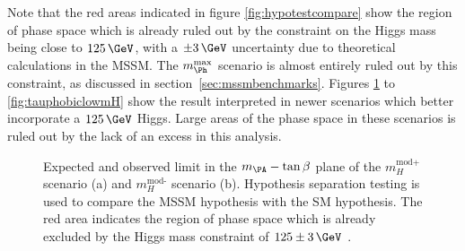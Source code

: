 Note that the red areas indicated in figure \ref{fig:hypotestcompare} show the
region of phase space which is already ruled out by the constraint on the Higgs
mass being close to $125\,\GeV$, with a $\pm 3\,\GeV$ uncertainty due to
theoretical calculations in the \ac{MSSM}. The $m_{\Ph}^{\text{max}}$ scenario
is almost entirely ruled out by this constraint, as discussed in
section~\ref{sec:mssmbenchmarks}. Figures \ref{fig:mhmodpmhmodm} to \ref{fig:tauphobiclowmH}
show the result interpreted in newer scenarios which better incorporate a
$125\,\GeV$ Higgs. Large areas of the phase space in these scenarios is ruled out
by the lack of an excess in this analysis.


\begin{figure}[tbh]
\caption[Expected and observed limit in the $m_{\PA}-\tan\beta$ plane of the
$m_H^{\text{mod+}}$ scenario (a) and $m_H^{\text{mod-}}$ scenario (b).]
{Expected and observed limit in the $m_{\PA}-\tan\beta$ plane of the
$m_H^{\text{mod+}}$ scenario (a) and $m_H^{\text{mod-}}$ scenario (b). Hypothesis
separation testing is used to compare the \ac{MSSM} hypothesis with the SM
hypothesis. The red area indicates the region of phase space which is already
excluded by the Higgs mass constraint of $125\pm3\,\GeV$ \cite{HIG-13-021}.}
\label{fig:mhmodpmhmodm}
\end{figure}

